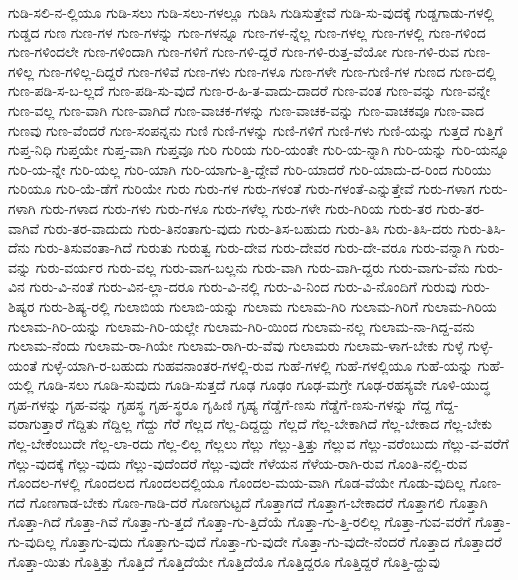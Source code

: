 {ಗುಡಿ-ಸಲಿ-ನ-ಲ್ಲಿಯೂ
ಗುಡಿ-ಸಲು
ಗುಡಿ-ಸಲು-ಗಳಲ್ಲೂ
ಗುಡಿಸಿ
ಗುಡಿಸುತ್ತೇವೆ
ಗುಡಿ-ಸು-ವುದಕ್ಕೆ
ಗುಡ್ಡಗಾಡು-ಗಳಲ್ಲಿ
ಗುಡ್ಡದ
ಗುಣ
ಗುಣ-ಗಳ
ಗುಣ-ಗಳನ್ನು
ಗುಣ-ಗಳನ್ನೂ
ಗುಣ-ಗಳ-ನ್ನೆಲ್ಲ
ಗುಣ-ಗಳಲ್ಲ
ಗುಣ-ಗಳಲ್ಲಿ
ಗುಣ-ಗಳಿಂದ
ಗುಣ-ಗಳಿಂದಲೇ
ಗುಣ-ಗಳಿಂದಾಗಿ
ಗುಣ-ಗಳಿಗೆ
ಗುಣ-ಗಳಿ-ದ್ದರೆ
ಗುಣ-ಗಳಿ-ರುತ್ತ-ವೆಯೋ
ಗುಣ-ಗಳಿ-ರುವ
ಗುಣ-ಗಳಿಲ್ಲ
ಗುಣ-ಗಳಿಲ್ಲ-ದಿದ್ದರೆ
ಗುಣ-ಗಳಿವೆ
ಗುಣ-ಗಳು
ಗುಣ-ಗಳೂ
ಗುಣ-ಗಳೇ
ಗುಣ-ಗುಣಿ-ಗಳ
ಗುಣದ
ಗುಣ-ದಲ್ಲಿ
ಗುಣ-ಪಡಿ-ಸ-ಬ-ಲ್ಲದೆ
ಗುಣ-ಪಡಿ-ಸು-ವುದೆ
ಗುಣ-ರ-ಹಿ-ತ-ವಾದು-ದಾದರೆ
ಗುಣ-ವಂತ
ಗುಣ-ವನ್ನು
ಗುಣ-ವನ್ನೇ
ಗುಣ-ವಲ್ಲ
ಗುಣ-ವಾಗಿ
ಗುಣ-ವಾಗಿದೆ
ಗುಣ-ವಾಚಕ-ಗಳನ್ನು
ಗುಣ-ವಾಚಕ-ವನ್ನು
ಗುಣ-ವಾಚಕವೂ
ಗುಣ-ವಾದ
ಗುಣವು
ಗುಣ-ವೆಂದರೆ
ಗುಣ-ಸಂಪನ್ನನು
ಗುಣಿ
ಗುಣಿ-ಗಳನ್ನು
ಗುಣಿ-ಗಳಿಗೆ
ಗುಣಿ-ಗಳು
ಗುಣಿ-ಯನ್ನು
ಗುತ್ತದೆ
ಗುತ್ತಿಗೆ
ಗುಪ್ತ-ನಿಧಿ
ಗುಪ್ತಯೇ
ಗುಪ್ತ-ವಾಗಿ
ಗುಪ್ತವೂ
ಗುರಿ
ಗುರಿಯ
ಗುರಿ-ಯಂತೇ
ಗುರಿ-ಯ-ನ್ನಾಗಿ
ಗುರಿ-ಯನ್ನು
ಗುರಿ-ಯನ್ನೂ
ಗುರಿ-ಯ-ನ್ನೇ
ಗುರಿ-ಯಲ್ಲ
ಗುರಿ-ಯಾಗಿ
ಗುರಿ-ಯಾಗು-ತ್ತಿ-ದ್ದೇವೆ
ಗುರಿ-ಯಾದರೆ
ಗುರಿ-ಯಾದು-ದ-ರಿಂದ
ಗುರಿಯು
ಗುರಿಯೂ
ಗುರಿ-ಯೆ-ಡೆಗೆ
ಗುರಿಯೇ
ಗುರು
ಗುರು-ಗಳ
ಗುರು-ಗಳಂತೆ
ಗುರು-ಗಳಂತೆ-ಎನ್ನುತ್ತೇವೆ
ಗುರು-ಗಳಾಗ
ಗುರು-ಗಳಾಗಿ
ಗುರು-ಗಳಾದ
ಗುರು-ಗಳು
ಗುರು-ಗಳೂ
ಗುರು-ಗಳೆಲ್ಲ
ಗುರು-ಗಳೇ
ಗುರು-ಗಿರಿಯ
ಗುರು-ತರ
ಗುರು-ತರ-ವಾಗಿವೆ
ಗುರು-ತರ-ವಾದುದು
ಗುರು-ತಿನಂತಾಗು-ವುದು
ಗುರು-ತಿಸ-ಬಹುದು
ಗುರು-ತಿಸಿ
ಗುರು-ತಿಸಿ-ದರು
ಗುರು-ತಿಸಿ-ದೆನು
ಗುರು-ತಿಸುವಂತಾ-ಗಿದೆ
ಗುರುತು
ಗುರುತ್ವ
ಗುರು-ದೇವ
ಗುರು-ದೇವರ
ಗುರು-ದೇ-ವರೂ
ಗುರು-ವನ್ನಾಗಿ
ಗುರು-ವನ್ನು
ಗುರು-ವರ್ಯರ
ಗುರು-ವಲ್ಲ
ಗುರು-ವಾಗ-ಬಲ್ಲನು
ಗುರು-ವಾಗಿ
ಗುರು-ವಾಗಿ-ದ್ದರು
ಗುರು-ವಾಗು-ವೆನು
ಗುರು-ವಿನ
ಗುರು-ವಿ-ನಂತೆ
ಗುರು-ವಿನ-ಲ್ಲಾ-ದರೂ
ಗುರು-ವಿ-ನಲ್ಲಿ
ಗುರು-ವಿ-ನಿಂದ
ಗುರು-ವಿ-ನೊಂದಿಗೆ
ಗುರುವು
ಗುರು-ಶಿಷ್ಯರ
ಗುರು-ಶಿಷ್ಯ-ರಲ್ಲಿ
ಗುಲಾಬಿಯ
ಗುಲಾಬಿ-ಯನ್ನು
ಗುಲಾಮ
ಗುಲಾಮ-ಗಿರಿ
ಗುಲಾಮ-ಗಿರಿಗೆ
ಗುಲಾಮ-ಗಿರಿಯ
ಗುಲಾಮ-ಗಿರಿ-ಯನ್ನು
ಗುಲಾಮ-ಗಿರಿ-ಯಲ್ಲೇ
ಗುಲಾಮ-ಗಿರಿ-ಯಿಂದ
ಗುಲಾಮ-ನಲ್ಲ
ಗುಲಾಮ-ನಾ-ಗಿದ್ದ-ವನು
ಗುಲಾಮ-ನೆಂದು
ಗುಲಾಮ-ರಾ-ಗಿಯೇ
ಗುಲಾಮ-ರಾಗಿ-ರು-ವೆವು
ಗುಲಾಮರು
ಗುಲಾಮ-ಳಾಗ-ಬೇಕು
ಗುಳ್ಳೆ
ಗುಳ್ಳೆ-ಯಂತೆ
ಗುಳ್ಳೆ-ಯಾಗಿ-ರ-ಬಹುದು
ಗುಹವನಾಂತರ-ಗಳಲ್ಲಿ-ರುವ
ಗುಹೆ-ಗಳಲ್ಲಿ
ಗುಹೆ-ಗಳಲ್ಲಿಯೂ
ಗುಹೆ-ಯನ್ನು
ಗುಹೆ-ಯಲ್ಲಿ
ಗೂಡಿ-ಸಲು
ಗೂಡಿ-ಸುವುದು
ಗೂಡಿ-ಸುತ್ತದೆ
ಗೂಢ
ಗೂಢಂ
ಗೂಢ-ಮಗ್ರೇ
ಗೂಢ-ರಹಸ್ಯವೇ
ಗೂಳಿ-ಯುದ್ಧ
ಗೃಹ-ಗಳನ್ನು
ಗೃಹ-ವನ್ನು
ಗೃಹಸ್ಥ
ಗೃಹ-ಸ್ಥರೂ
ಗೃಹಿಣಿ
ಗೃಹ್ಯ
ಗೆಡ್ಡೆಗೆ-ಣಸು
ಗೆಡ್ಡೆಗೆ-ಣಸು-ಗಳನ್ನು
ಗೆದ್ದ
ಗೆದ್ದ-ವರಾಗುತ್ತಾರೆ
ಗೆದ್ದಿತು
ಗೆದ್ದಿಲ್ಲ
ಗೆದ್ದು
ಗೆರೆ
ಗೆಲ್ಲದ
ಗೆಲ್ಲ-ದಿದ್ದದ್ದು
ಗೆಲ್ಲದೆ
ಗೆಲ್ಲ-ಬೇಕಾಗಿದೆ
ಗೆಲ್ಲ-ಬೇಕಾದ
ಗೆಲ್ಲ-ಬೇಕು
ಗೆಲ್ಲ-ಬೇಕೆಂಬುದೇ
ಗೆಲ್ಲ-ಲಾ-ರದು
ಗೆಲ್ಲ-ಲಿಲ್ಲ
ಗೆಲ್ಲಲು
ಗೆಲ್ಲು
ಗೆಲ್ಲು-ತ್ತಿತ್ತು
ಗೆಲ್ಲುವ
ಗೆಲ್ಲು-ವರೆಂಬುದು
ಗೆಲ್ಲು-ವ-ವರೆಗೆ
ಗೆಲ್ಲು-ವುದಕ್ಕೆ
ಗೆಲ್ಲು-ವುದು
ಗೆಲ್ಲು-ವುದೆಂದರೆ
ಗೆಲ್ಲು-ವುದೇ
ಗೆಳೆಯನ
ಗೆಳೆಯ-ರಾಗಿ-ರುವ
ಗೊಂತಿ-ನಲ್ಲಿ-ರುವ
ಗೊಂದಲ-ಗಳಲ್ಲಿ
ಗೊಂದಲದ
ಗೊಂದಲದಲ್ಲಿಯೂ
ಗೊಂದಲ-ಮಯ-ವಾಗಿ
ಗೊಡ-ವೆಯೇ
ಗೊಡು-ವುದಿಲ್ಲ
ಗೊಣ-ಗದೆ
ಗೊಣಗಾಡ-ಬೇಕು
ಗೊಣ-ಗಾಡಿ-ದರೆ
ಗೊಣಗುಟ್ಟದೆ
ಗೊತ್ತಾಗದೆ
ಗೊತ್ತಾಗ-ಬೇಕಾದರೆ
ಗೊತ್ತಾಗಲಿ
ಗೊತ್ತಾಗಿ
ಗೊತ್ತಾ-ಗಿದೆ
ಗೊತ್ತಾ-ಗಿವೆ
ಗೊತ್ತಾ-ಗು-ತ್ತದೆ
ಗೊತ್ತಾ-ಗು-ತ್ತಿದೆಯೆ
ಗೊತ್ತಾ-ಗು-ತ್ತಿ-ರಲಿಲ್ಲ
ಗೊತ್ತಾ-ಗುವ-ವರೆಗೆ
ಗೊತ್ತಾ-ಗು-ವುದಿಲ್ಲ
ಗೊತ್ತಾಗು-ವುದು
ಗೊತ್ತಾಗು-ವುದೆ
ಗೊತ್ತಾ-ಗು-ವುದೇ
ಗೊತ್ತಾ-ಗು-ವುದೇ-ನೆಂದರೆ
ಗೊತ್ತಾದ
ಗೊತ್ತಾದರೆ
ಗೊತ್ತಾ-ಯಿತು
ಗೊತ್ತಿತ್ತು
ಗೊತ್ತಿದೆ
ಗೊತ್ತಿದೆಯೇ
ಗೊತ್ತಿದೆಯೊ
ಗೊತ್ತಿದ್ದರೂ
ಗೊತ್ತಿದ್ದರೆ
ಗೊತ್ತಿ-ದ್ದುವು
}
